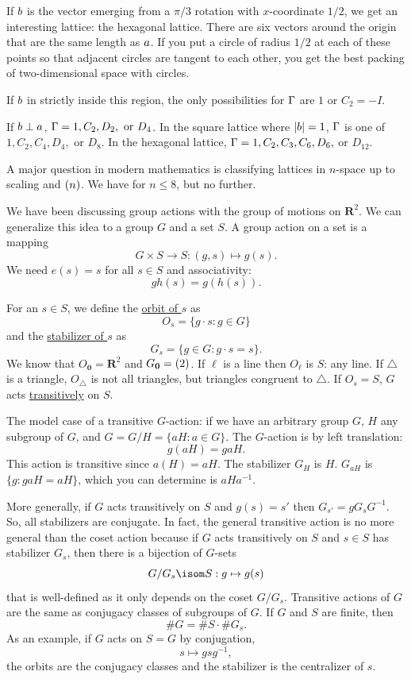 \documentclass[11pt, oneside]{amsart}
\numberwithin{equation}{section}
\numberwithin{theorem}{section}
\theoremstyle{definition}
\let\O\relax
\let\bar\relax
\let\bf\relax
\def\R{\mathbf{R}}
\def\0{\mathbf{0}}
\begin{document}
{If $\bf b$ is the vector emerging from a $\pi/3$ rotation with $x$-coordinate $1/2$, we get an interesting lattice: the hexagonal lattice. There are six vectors around the origin that are the same length as $\bf a$. If you put a circle of radius $1/2$ at each of these points so that adjacent circles are tangent to each other, you get the best packing of two-dimensional space with circles. 

If $\bf b$ in strictly inside this region, the only possibilities for $\bar\Gamma$ are $1$ or $C_2=-I$.

If $\bf b \perp \bf a$, $\bar\Gamma = 1,C_2,D_2, \textrm{ or }D_4$. In the square lattice where $|\bf b| = 1$, $\bar\Gamma$ is one of $1,C_2,C_4,D_4,$ or $D_8$. In the hexagonal lattice, $\bar\Gamma = 1,C_2,C_3,C_6, D_6,$ or $D_{12}$.

A major question in modern mathematics is classifying lattices in $n$-space up to scaling and $\O(n)$. We have for $n\leqslant 8$, but no further.

We have been discussing group actions with the group of motions on $\R^2$. We can generalize this idea to a group $G$ and a set $S$. A group action on a set is a mapping 
$$
G\times S \to S : (g,s)\mapsto g(s).
$$
We need $e(s)=s$ for all $s\in S$ and associativity:
$$
gh(s) = g(h(s)).
$$

For an $s\in S$, we define the \underline{orbit of $s$} as
$$
O_s = \{g\cdot s : g\in G\}
$$
and the \underline{stabilizer of $s$} as
$$
G_s = \{g\in G: g \cdot s = s\}.
$$
We know that $O_\0 =\R^2$ and $G_\0 = \O(2)$. If $\ell$ is a line then $O_\ell$ is $S$: any line. If $\triangle $ is a triangle, $O_\triangle$ is not all triangles, but triangles congruent to $\triangle$. If $O_s =S$, $G$ acts \underline{transitively} on $S$.

The model case of a transitive $G$-action: if we have an arbitrary group $G$, $H$ any subgroup of $G$, and $G=G/H=\{aH:a\in G\}$. The $G$-action is by left translation:
$$
g(aH) = gaH.
$$
This action is transitive since $a(H) = aH$. The stabilizer $G_H $ is $H$. $G_{aH}$ is $\{g:gaH=aH\}$, which you can determine is $aHa^{-1}$.

More generally, if $G$ acts transitively on $S$ and $g(s)=s'$ then $G_{s'}  = gG_sG^{-1}$. So, all stabilizers are conjugate. In fact, the general transitive action is no more general than the coset action because if $G$ acts transitively on $S$ and $s\in S$ has stabilizer $G_s$, then there is a bijection of $G$-sets 
$$
G/G_s \isom S: g\mapsto g(s)
$$ 
that is well-defined as it only depends on the coset $G/G_s$. 
Transitive actions of $G$ are the same as conjugacy classes of subgroups of $G$. If $G$ and $S$ are finite, then
$$
\#G = \#S \cdot \#G_s. 
$$
As an example, if $G$ acts on $S=G$ by conjugation, $$s\mapsto gsg^{-1},$$ the orbits are the conjugacy classes and the stabilizer is the centralizer of $s$.

}
\end{document}
